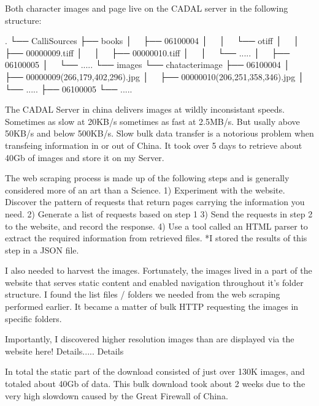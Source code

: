     Both character images and page live on the CADAL server in the following structure:


.
└── CalliSources
    ├── books
    │   ├── 06100004
    │   │   └── otiff
    │   │       ├── 00000009.tiff
    │   │       ├── 00000010.tiff
    │   │       └── .....
    │   ├── 06100005
    │   └── .....
    └── images
        └── chatacterimage
            ├── 06100004
            │   ├── 00000009(266,179,402,296).jpg
            │   ├── 00000010(206,251,358,346).jpg
            │   └── .....
            ├── 06100005
            └── .....


The CADAL Server in china delivers images at wildly inconsistant speeds.  Sometimes as slow at 20KB/s sometimes as fast at 2.5MB/s.  But usally above 50KB/s and below 500KB/s.  Slow bulk data transfer is a notorious problem when transfeing information in or out of China.  It took over 5 days to retrieve about 40Gb of images and store it on my Server.

            
            
            
            The web scraping process is made up of the following steps and is generally considered more of an art than a Science.
                1)  Experiment with the website.  Discover the pattern of requests that return pages carrying the information you need.
                2)  Generate a list of requests based on step 1
                3)  Send the requests in step 2 to the website, and record the response.
                4)  Use a tool called an HTML parser to extract the required information from retrieved files.
                    *I stored the results of this step in a JSON file.
                
            I also needed to harvest the images.  Fortunately, the images lived in a part of the website that serves static content and enabled navigation throughout it's folder structure.  I found the list files / folders we needed from the web scraping performed earlier.  It became a matter of bulk HTTP requesting the images in specific folders.
            
            Importantly, I discovered higher resolution images than are displayed via the website here!  Details..... Details
            
            In total the static part of the download consisted of just over 130K images, and totaled about 40Gb of data.  This bulk download took about 2 weeks due to the very high slowdown caused by the Great Firewall of China.
            
